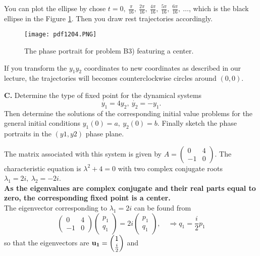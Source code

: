 \documentclass[11pt,a4paper]{article}
\begin{document}
\begin{enumerate}[\bfseries 1)]
\begin{equation*}
		\end{equation*}
		You can plot the ellipse by chose $t = 0,\ \frac{\pi}{16},\ \frac{2\pi}{16},\ \frac{4\pi}{16},\ \frac{5\pi}{16},\ \frac{6\pi}{16},\ \ldots$, which is the black ellipse in the Figure \ref{f4}. Then you draw rest trajectories accordingly.
		\begin{figure}[H]
			\centering
				\texttt{[image: pdf1204.PNG]}
				\caption{ The phase portrait for problem B3) featuring a center.}
				\label{f4}
		\end{figure}
		If you transform the $y_1y_2$ coordinates to new coordinates as described in our lecture, the trajectories will becomes counterclockwise circles around $(0, 0)$.
	\end{enumerate}
	\textbf{C.} Determine the type of fixed point for the dynamical systems
	$$
	\dot{y_1} = 4y_2,\ \dot{y_2} = -y_1.
	$$
	Then determine the solutions of the corresponding initial value problems for the general initial conditions $y_1(0) = a,\ y_2(0) = b$. Finally sketch the phase portraits in the $(y1, y2)$ phase plane.\par
	 The matrix associated with this system is given by
	$
	A
	=
	\begin{pmatrix}
		0 & 4\\
		-1 & 0
	\end{pmatrix}
	$.
	The characteristic equation is $\lambda^2 +4 = 0$ with two complex conjugate roots $\lambda_1 = 2i,\ \lambda_2 = -2i$.\\
	\textbf{As the eigenvalues are complex conjugate and their real parts equal to zero, the corresponding fixed point is a center.}\\
	The eigenvector corresponding to $\lambda_1 = 2i$ can be found from
	$$
	\begin{pmatrix}
		0 & 4\\
		-1 & 0
	\end{pmatrix}
	\begin{pmatrix}
		p_1\\
		q_1
	\end{pmatrix}
	=
	2i
	\begin{pmatrix}
		p_1\\
		q_1
	\end{pmatrix},\quad
	\Rightarrow
	q_1
	=
	\frac{i}{2}p_1
	$$
	so that the eigenvectors are
	$
	\vb{u_1}
	=
	\begin{pmatrix}
		1\\
		\frac{i}{2}
	\end{pmatrix}
	$
	and
\end{document}

